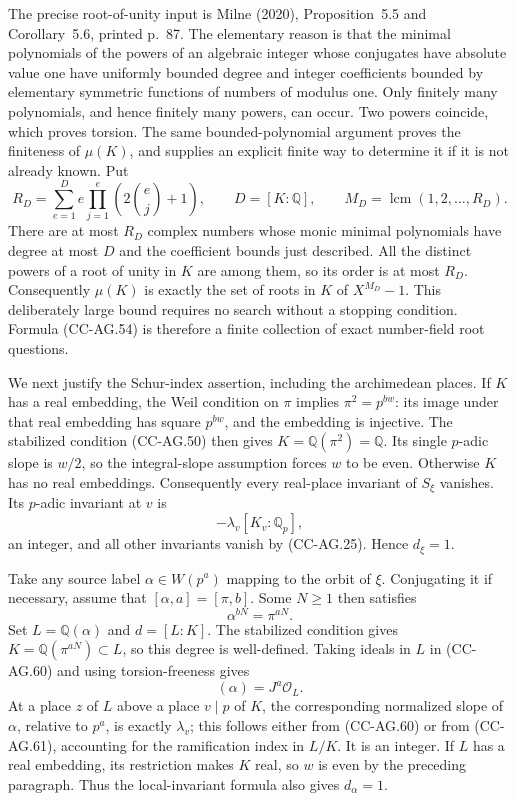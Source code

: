 The precise root-of-unity input is Milne (2020),
Proposition~5.5 and Corollary~5.6, printed p.~87.
The elementary reason is that the minimal polynomials
of the powers of an algebraic integer whose conjugates
have absolute value one have uniformly bounded degree
and integer coefficients bounded by elementary symmetric
functions of numbers of modulus one.  Only finitely
many polynomials, and hence finitely many powers, can
occur.  Two powers coincide, which proves torsion.
The same bounded-polynomial argument proves the
finiteness of \(\mu(K)\), and supplies an explicit finite
way to determine it if it is not already known.  Put
\[
 R_D=\sum_{e=1}^{D}e\prod_{j=1}^{e}
                    \left(2\binom ej+1\right),
 \qquad D=[K:\mathbb Q],\qquad
 M_D=\operatorname{lcm}(1,2,\ldots,R_D).
\]
There are at most \(R_D\) complex numbers whose monic
minimal polynomials have degree at most \(D\) and the
coefficient bounds just described.  All the distinct
powers of a root of unity in \(K\) are among them, so
its order is at most \(R_D\).  Consequently \(\mu(K)\)
is exactly the set of roots in \(K\) of
\(X^{M_D}-1\).  This deliberately large bound requires
no search without a stopping condition.
Formula (CC-AG.54) is therefore a finite collection
of exact number-field root questions.

We next justify the Schur-index assertion, including
the archimedean places.  If \(K\) has a real embedding,
the Weil condition on \(\pi\) implies
\(\pi^2=p^{bw}\): its image under that real embedding
has square \(p^{bw}\), and the embedding is injective.
The stabilized condition (CC-AG.50) then gives
\(K=\mathbb Q(\pi^2)=\mathbb Q\).
Its single \(p\)-adic slope is \(w/2\), so the
integral-slope assumption forces \(w\) to be even.
Otherwise \(K\) has no real embeddings.
Consequently every real-place invariant of \(S_\xi\)
vanishes.  Its \(p\)-adic invariant at \(v\) is
\[
                       -\lambda_v[K_v:\mathbb Q_p],
\]
an integer, and all other invariants vanish by
(CC-AG.25).  Hence \(d_\xi=1\).

Take any source label \(\alpha\in W(p^a)\) mapping to
the orbit of \(\xi\).  Conjugating it if necessary,
assume that \([\alpha,a]=[\pi,b]\).  Some \(N\ge1\)
then satisfies
\[
                           \alpha^{bN}=\pi^{aN}.             \tag{CC-AG.60}
\]
Set \(L=\mathbb Q(\alpha)\) and \(d=[L:K]\).
The stabilized condition gives
\(K=\mathbb Q(\pi^{aN})\subset L\), so this degree
is well-defined.
Taking ideals in \(L\) in (CC-AG.60) and using
torsion-freeness gives
\[
                              (\alpha)=J^a\mathcal O_L.
                                                               \tag{CC-AG.61}
\]
At a place \(z\) of \(L\) above a place \(v\mid p\)
of \(K\), the corresponding normalized slope of
\(\alpha\), relative to \(p^a\), is exactly
\(\lambda_v\); this follows either from
(CC-AG.60) or from (CC-AG.61), accounting for the
ramification index in \(L/K\).
It is an integer.  If \(L\) has a real embedding,
its restriction makes \(K\) real, so \(w\) is even
by the preceding paragraph.
Thus the local-invariant formula also gives
\(d_\alpha=1\).

